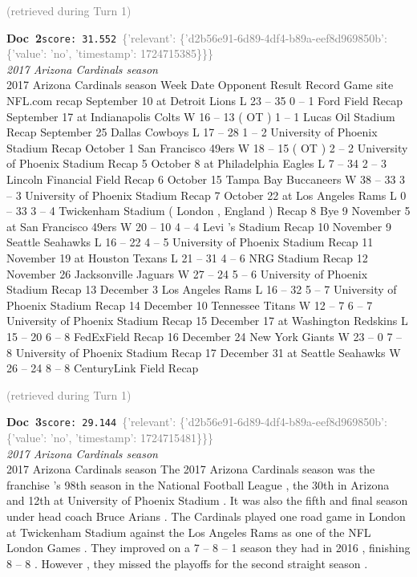 \documentclass[a4paper,11pt]{article}
\begin{document}
\hfill{\tiny\textcolor{gray}{(retrieved during Turn 1)}}
\begin{docenv}
{\footnotesize\textcolor{doccolor}{\textbf{Doc~2}}}\hfill{\tiny\texttt{score:~31.552}}\ {\tiny\textcolor{gray}{\{'relevant': \{'d2b56e91-6d89-4df4-b89a-eef8d969850b': \{'value': 'no', 'timestamp': 1724715385\}\}\}}}\\[3pt]
{\small\textit{2017 Arizona Cardinals season}}\\[2pt]
\vspace{2pt}
{\footnotesize 2017 Arizona Cardinals season
Week Date Opponent Result Record Game site NFL.com recap September 10 at Detroit Lions L 23 -- 35 0 -- 1 Ford Field Recap September 17 at Indianapolis Colts W 16 -- 13 ( OT ) 1 -- 1 Lucas Oil Stadium Recap September 25 Dallas Cowboys L 17 -- 28 1 -- 2 University of Phoenix Stadium Recap October 1 San Francisco 49ers W 18 -- 15 ( OT ) 2 -- 2 University of Phoenix Stadium Recap 5 October 8 at Philadelphia Eagles L 7 -- 34 2 -- 3 Lincoln Financial Field Recap 6 October 15 Tampa Bay Buccaneers W 38 -- 33 3 -- 3 University of Phoenix Stadium Recap 7 October 22 at Los Angeles Rams L 0 -- 33 3 -- 4 Twickenham Stadium ( London , England ) Recap 8 Bye 9 November 5 at San Francisco 49ers W 20 -- 10 4 -- 4 Levi 's Stadium Recap 10 November 9 Seattle Seahawks L 16 -- 22 4 -- 5 University of Phoenix Stadium Recap 11 November 19 at Houston Texans L 21 -- 31 4 -- 6 NRG Stadium Recap 12 November 26 Jacksonville Jaguars W 27 -- 24 5 -- 6 University of Phoenix Stadium Recap 13 December 3 Los Angeles Rams L 16 -- 32 5 -- 7 University of Phoenix Stadium Recap 14 December 10 Tennessee Titans W 12 -- 7 6 -- 7 University of Phoenix Stadium Recap 15 December 17 at Washington Redskins L 15 -- 20 6 -- 8 FedExField Recap 16 December 24 New York Giants W 23 -- 0 7 -- 8 University of Phoenix Stadium Recap 17 December 31 at Seattle Seahawks W 26 -- 24 8 -- 8 CenturyLink Field Recap}
\end{docenv}
\hfill{\tiny\textcolor{gray}{(retrieved during Turn 1)}}
\begin{docenv}
{\footnotesize\textcolor{doccolor}{\textbf{Doc~3}}}\hfill{\tiny\texttt{score:~29.144}}\ {\tiny\textcolor{gray}{\{'relevant': \{'d2b56e91-6d89-4df4-b89a-eef8d969850b': \{'value': 'no', 'timestamp': 1724715481\}\}\}}}\\[3pt]
{\small\textit{2017 Arizona Cardinals season}}\\[2pt]
\vspace{2pt}
{\footnotesize 2017 Arizona Cardinals season
The 2017 Arizona Cardinals season was the franchise 's 98th season in the National Football League , the 30th in Arizona and 12th at University of Phoenix Stadium . It was also the fifth and final season under head coach Bruce Arians . The Cardinals played one road game in London at Twickenham Stadium against the Los Angeles Rams as one of the NFL London Games . They improved on a 7 -- 8 -- 1 season they had in 2016 , finishing 8 -- 8 . However , they missed the playoffs for the second straight season .}
\end{docenv}
\end{document}
